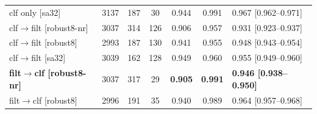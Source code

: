 \begin{table}[htbp]
{\begin{tabular}{lcccccl}
        clf only [sa32]              & 3137 &  187 &  30 & 0.944 & 0.991 & 0.967 [0.962--0.971] \\
        clf$\to$filt [robust8-nr]    & 3037 & 314 & 126 & 0.906 & 0.957 & 0.931 [0.923--0.937] \\
        clf$\to$filt [robust8]       & 2993 & 187 & 130 & 0.941 & 0.955 & 0.948 [0.943--0.954] \\
        clf$\to$filt [sa32]          & 3039 &  162 & 128 & 0.949 & 0.960 & 0.955 [0.949--0.960] \\
        \textbf{filt$\to$clf [robust8-nr]} & 3037 & 317 & 29 & \textbf{0.905} & \textbf{0.991} & \textbf{0.946 [0.938--0.950]} \\
        filt$\to$clf [robust8]       & 2996 &  191 &  35 & 0.940 & 0.989 & 0.964 [0.957--0.968] \\
        \bottomrule
    \end{tabular}}
\end{table}


